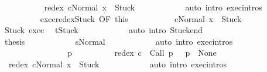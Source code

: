 \begin{isabellebody}
\ \ \ \ \ \ \ \ \isamarkupfalse%
\ {\isachardoublequoteopen}{\isasymGamma}{\isasymturnstile}\ {\isasymlangle}redex\ cNormal\ x{\isasymrangle}\ {\isasymRightarrow}\ Stuck{\isachardoublequoteclose}\isanewline
\ \ \ \ \ \ \ \ \ \ \isamarkupfalse%
\ {\isacharparenleft}auto\ intro{\isacharcolon}\ exec{\isachardot}intros{\isacharparenright}\isanewline
\ \ \ \ \ \ \ \ \isamarkupfalse%
\ exec{\isacharunderscore}redex{\isacharunderscore}Stuck\ {\isacharbrackleft}OF\ this{\isacharbrackright}\isanewline
\ \ \ \ \ \ \ \ \isamarkupfalse%
\ {\isachardoublequoteopen}{\isasymGamma}{\isasymturnstile}\ {\isasymlangle}cNormal\ x{\isasymrangle}\ {\isasymRightarrow}\ Stuck{\isachardoublequoteclose}\isacommand{{\isachardot}}\isamarkupfalse%
\isanewline
\ \ \ \ \ \ \ \ \isamarkupfalse%
\ \isamarkupfalse%
\ Stuck\ exec{\isacharprime}\ \isamarkupfalse%
\ {\isachardoublequoteopen}t{\isacharequal}Stuck{\isachardoublequoteclose}\isanewline
\ \ \ \ \ \ \ \ \ \ \isamarkupfalse%
\ {\isacharparenleft}auto\ intro{\isacharcolon}\ Stuck{\isacharunderscore}end{\isacharparenright}\isanewline
\ \ \ \ \ \ \ \ \isamarkupfalse%
\isanewline
\ \ \ \ \ \ \ \ \isamarkupfalse%
\ {\isacharquery}thesis\isanewline
\ \ \ \ \ \ \ \ \ \ \isamarkupfalse%
\ s{\isacharunderscore}Normal\isanewline
\ \ \ \ \ \ \ \ \ \ \isamarkupfalse%
\ {\isacharparenleft}auto\ intro{\isacharcolon}\ exec{\isachardot}intros{\isacharparenright}\isanewline
\ \ \ \ \ \ \isacommand{{\isacharbraceright}}\isamarkupfalse%
\isanewline
\ \ \ \ \ \ \isamarkupfalse%
\isanewline
\ \ \ \ \ \ \isacommand{{\isacharbraceleft}}\isamarkupfalse%
\isanewline
\ \ \ \ \ \ \ \ \isamarkupfalse%
\ p\isanewline
\ \ \ \ \ \ \ \ \isamarkupfalse%
\ {\isachardoublequoteopen}redex\ c\ {\isacharequal}\ Call\ p{\isachardoublequoteclose}\ \ {\isachardoublequoteopen}{\isasymGamma}\ p\ {\isacharequal}\ None{\isachardoublequoteclose}\isanewline
\ \ \ \ \ \ \ \ \isamarkupfalse%
\ {\isachardoublequoteopen}{\isasymGamma}{\isasymturnstile}\ {\isasymlangle}redex\ cNormal\ x{\isasymrangle}\ {\isasymRightarrow}\ Stuck{\isachardoublequoteclose}\isanewline
\ \ \ \ \ \ \ \ \ \ \isamarkupfalse%
\ {\isacharparenleft}auto\ intro{\isacharcolon}\ exec{\isachardot}intros{\isacharparenright}\isanewline

\end{isabellebody}
